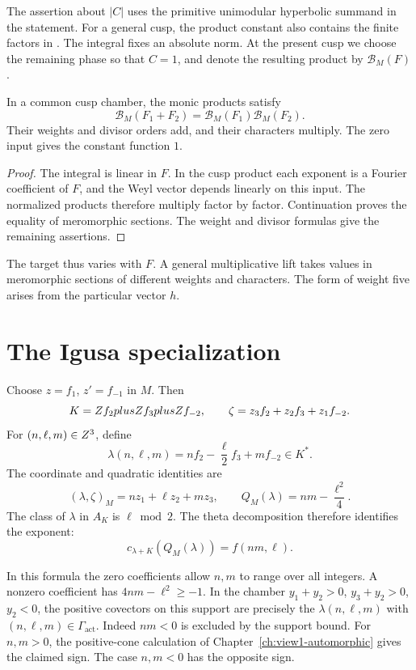 The assertion about \(|C|\) uses the primitive unimodular hyperbolic
summand in the statement.  For a general cusp, the product constant
also contains the finite factors in
\cite[Theorem 13.3(5)]{B}.
The integral fixes an absolute norm.  At the present cusp we choose
the remaining phase so that \(C=1\), and denote the resulting
product by \(\mathcal B_M(F)\).

\begin{theorem}
\label{thm:regularized-theta-correspondence}
In a common cusp chamber, the monic products satisfy
\[
 \mathcal B_M(F_1+F_2)=\mathcal B_M(F_1)\mathcal B_M(F_2).
\]
Their weights and divisor orders add, and their characters multiply.
The zero input gives the constant function \(1\).
\end{theorem}

\begin{proof}
The integral is linear in \(F\).
In the cusp product each exponent is a Fourier coefficient of \(F\),
and the Weyl vector depends linearly on this input.
The normalized products therefore multiply factor by factor.
Continuation proves the equality of meromorphic sections.
The weight and divisor formulas give the remaining assertions.
\end{proof}

The target thus varies with \(F\).
A general multiplicative lift takes values in meromorphic sections
of different weights and characters.  The form of weight five
arises from the particular vector \(h\).

\section{The Igusa specialization}
\label{ssec:theta-lift-delta5}

Choose \(z=f_1\), \(z'=f_{-1}\) in \(M\).
Then
\[
 K=Z f_2plusZ f_3plusZ f_{-2},\qquad
 \zeta=z_3f_2+z_2f_3+z_1f_{-2}.
\]
For \((n,\ell,m)\in Z^3\), define
\[
 \lambda(n,\ell,m)
 =nf_2-\frac{\ell}{2}f_3+mf_{-2}\in K^*.
\]
The coordinate and quadratic identities are
\[
 (\lambda,\zeta)_M=nz_1+\ell z_2+mz_3,\qquad
 Q_M(\lambda)=nm-\frac{\ell^2}{4}.
\]
The class of \(\lambda\) in \(A_K\) is \(\ell\bmod2\).
The theta decomposition therefore identifies the exponent:
\[
 c_{\lambda+K}(Q_M(\lambda))=f(nm,\ell).
\]

In this formula the zero coefficients allow \(n,m\) to range over
all integers.  A nonzero coefficient has
\(4nm-\ell^2\geq-1\).
In the chamber \(y_1+y_2>0\), \(y_3+y_2>0\), \(y_2<0\),
the positive covectors on this support are precisely the
\(\lambda(n,\ell,m)\) with
\((n,\ell,m)\in\Gamma_{\mathrm{act}}\).
Indeed \(nm<0\) is excluded by the support bound.
For \(n,m>0\), the positive-cone calculation of
Chapter~\ref{ch:view1-automorphic} gives the claimed sign.
The case \(n,m<0\) has the opposite sign.

